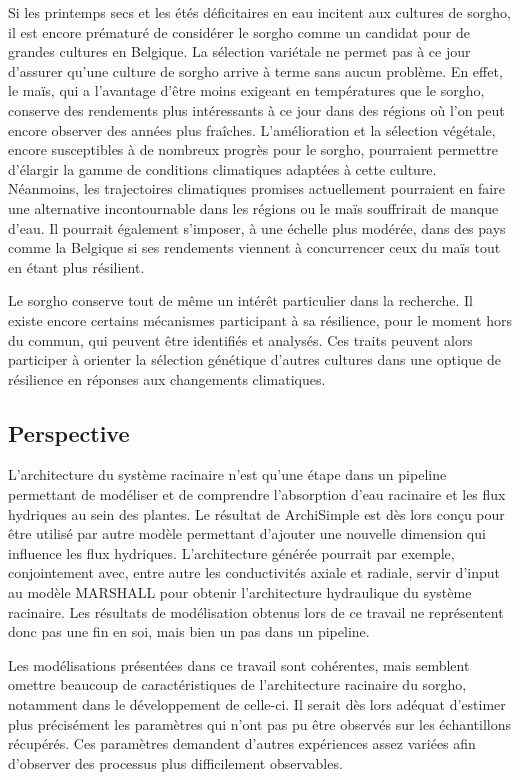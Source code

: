 Si les printemps secs et les étés déficitaires en eau incitent aux cultures de sorgho, il est encore prématuré de considérer le sorgho comme un candidat pour de grandes cultures en Belgique.
La sélection variétale ne permet pas à ce jour d'assurer qu'une culture de sorgho arrive à terme sans aucun problème.
En effet, le maïs, qui a l'avantage d'être moins exigeant en températures que le sorgho, conserve des rendements plus intéressants à ce jour dans des régions où l'on peut encore observer des années plus fraîches.
L'amélioration et la sélection végétale, encore susceptibles à de nombreux progrès pour le sorgho, pourraient permettre d'élargir la gamme de conditions climatiques adaptées à cette culture.
Néanmoins, les trajectoires climatiques promises actuellement pourraient en faire une alternative incontournable dans les régions ou le maïs souffrirait de manque d'eau.
Il pourrait également s'imposer, à une échelle plus modérée, dans des pays comme la Belgique si ses rendements viennent à concurrencer ceux du maïs tout en étant plus résilient.
\newline

Le sorgho conserve tout de même un intérêt particulier dans la recherche.
Il existe encore certains mécanismes participant à sa résilience, pour le moment hors du commun, qui peuvent être identifiés et analysés.
Ces traits peuvent alors participer à orienter la sélection génétique d'autres cultures dans une optique de résilience en réponses aux changements climatiques.

\subsection{Perspective}

L'architecture du système racinaire n'est qu'une étape dans un pipeline permettant de modéliser et de comprendre l'absorption d'eau racinaire et les flux hydriques au sein des plantes.
Le résultat de ArchiSimple est dès lors conçu pour être utilisé par autre modèle permettant d'ajouter une nouvelle dimension qui influence les flux hydriques.
L'architecture générée pourrait par exemple, conjointement avec, entre autre les conductivités axiale et radiale, servir d'input au modèle MARSHALL pour obtenir l'architecture hydraulique du système racinaire.
Les résultats de modélisation obtenus lors de ce travail ne représentent donc pas une fin en soi, mais bien un pas dans un pipeline.
\newline

Les modélisations présentées dans ce travail sont cohérentes, mais semblent omettre beaucoup de caractéristiques de l'architecture racinaire du sorgho, notamment dans le développement de celle-ci.
Il serait dès lors adéquat d'estimer plus précisément les paramètres qui n'ont pas pu être observés sur les échantillons récupérés.
Ces paramètres demandent d'autres expériences assez variées afin d'observer des processus plus difficilement observables.
\newline

